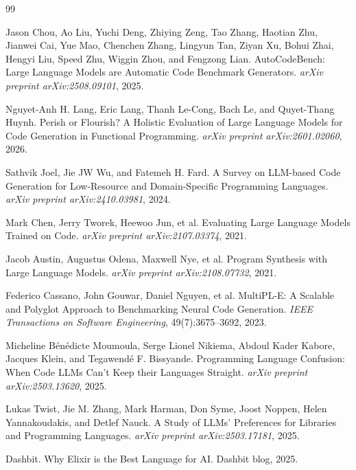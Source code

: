 \documentclass[11pt]{article}
\begin{document}
\clearpage
\begin{thebibliography}{99}

Jason Chou, Ao Liu, Yuchi Deng, Zhiying Zeng, Tao Zhang, Haotian Zhu, Jianwei Cai, Yue Mao, Chenchen Zhang, Lingyun Tan, Ziyan Xu, Bohui Zhai, Hengyi Liu, Speed Zhu, Wiggin Zhou, and Fengzong Lian.
\newblock AutoCodeBench: Large Language Models are Automatic Code Benchmark Generators.
\newblock \emph{arXiv preprint arXiv:2508.09101}, 2025.

Nguyet-Anh H. Lang, Eric Lang, Thanh Le-Cong, Bach Le, and Quyet-Thang Huynh.
\newblock Perish or Flourish? A Holistic Evaluation of Large Language Models for Code Generation in Functional Programming.
\newblock \emph{arXiv preprint arXiv:2601.02060}, 2026.

Sathvik Joel, Jie JW Wu, and Fatemeh H. Fard.
\newblock A Survey on LLM-based Code Generation for Low-Resource and Domain-Specific Programming Languages.
\newblock \emph{arXiv preprint arXiv:2410.03981}, 2024.

Mark Chen, Jerry Tworek, Heewoo Jun, et al.
\newblock Evaluating Large Language Models Trained on Code.
\newblock \emph{arXiv preprint arXiv:2107.03374}, 2021.

Jacob Austin, Augustus Odena, Maxwell Nye, et al.
\newblock Program Synthesis with Large Language Models.
\newblock \emph{arXiv preprint arXiv:2108.07732}, 2021.

Federico Cassano, John Gouwar, Daniel Nguyen, et al.
\newblock MultiPL-E: A Scalable and Polyglot Approach to Benchmarking Neural Code Generation.
\newblock \emph{IEEE Transactions on Software Engineering}, 49(7):3675--3692, 2023.

Micheline B\'en\'edicte Moumoula, Serge Lionel Nikiema, Abdoul Kader Kabore, Jacques Klein, and Tegawend\'e F. Bissyande.
\newblock Programming Language Confusion: When Code LLMs Can't Keep their Languages Straight.
\newblock \emph{arXiv preprint arXiv:2503.13620}, 2025.

Lukas Twist, Jie M. Zhang, Mark Harman, Don Syme, Joost Noppen, Helen Yannakoudakis, and Detlef Nauck.
\newblock A Study of LLMs' Preferences for Libraries and Programming Languages.
\newblock \emph{arXiv preprint arXiv:2503.17181}, 2025.

Dashbit.
\newblock Why Elixir is the Best Language for AI.
\newblock Dashbit blog, 2025.


\end{thebibliography}
\end{document}
